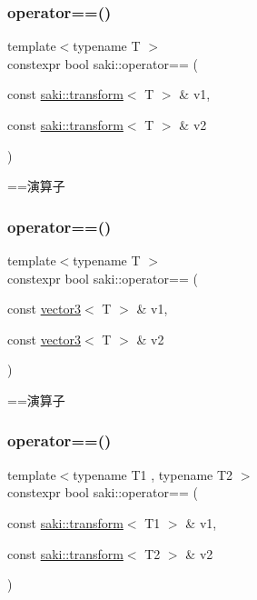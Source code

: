 \subsubsection{\texorpdfstring{operator==()}{operator==()}\hspace{0.1cm}{\footnotesize\ttfamily [2/14]}}
{\footnotesize\ttfamily template$<$typename T $>$ \\
constexpr bool saki\+::operator== (\begin{DoxyParamCaption}\item[{const \mbox{\hyperlink{classsaki_1_1transform}{saki\+::transform}}$<$ T $>$ \&}]{v1,  }\item[{const \mbox{\hyperlink{classsaki_1_1transform}{saki\+::transform}}$<$ T $>$ \&}]{v2 }\end{DoxyParamCaption})}



==演算子 

\mbox{\label{namespacesaki_a3ce1faca02399d52a09851a1b6e8afe3}} 
\subsubsection{\texorpdfstring{operator==()}{operator==()}\hspace{0.1cm}{\footnotesize\ttfamily [3/14]}}
{\footnotesize\ttfamily template$<$typename T $>$ \\
constexpr bool saki\+::operator== (\begin{DoxyParamCaption}\item[{const \mbox{\hyperlink{classsaki_1_1vector3}{vector3}}$<$ T $>$ \&}]{v1,  }\item[{const \mbox{\hyperlink{classsaki_1_1vector3}{vector3}}$<$ T $>$ \&}]{v2 }\end{DoxyParamCaption})}



==演算子 

\mbox{\label{namespacesaki_afde7d962261485c2054cd1a98ed337ed}} 
\subsubsection{\texorpdfstring{operator==()}{operator==()}\hspace{0.1cm}{\footnotesize\ttfamily [4/14]}}
{\footnotesize\ttfamily template$<$typename T1 , typename T2 $>$ \\
constexpr bool saki\+::operator== (\begin{DoxyParamCaption}\item[{const \mbox{\hyperlink{classsaki_1_1transform}{saki\+::transform}}$<$ T1 $>$ \&}]{v1,  }\item[{const \mbox{\hyperlink{classsaki_1_1transform}{saki\+::transform}}$<$ T2 $>$ \&}]{v2 }\end{DoxyParamCaption})}



